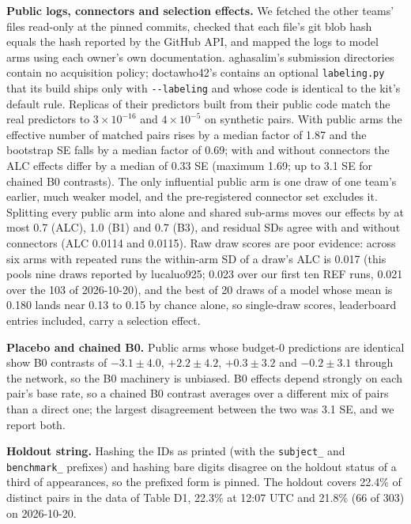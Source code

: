\documentclass[
]{article}
\begin{document}
\textbf{Public logs, connectors and selection effects.} We fetched the
other teams' files read-only at the pinned commits, checked that each
file's git blob hash equals the hash reported by the GitHub API, and
mapped the logs to model arms using each owner's own documentation.
aghasalim's submission directories contain no acquisition policy;
doctawho42's contains an optional \texttt{labeling.py} that its build
ships only with \texttt{-\/-labeling} and whose code is identical to the
kit's default rule. Replicas of their predictors built from their public
code match the real predictors to \(3 \times 10^{-16}\) and
\(4 \times 10^{-5}\) on synthetic pairs. With public arms the effective
number of matched pairs rises by a median factor of 1.87 and the
bootstrap SE falls by a median factor of 0.69; with and without
connectors the ALC effects differ by a median of 0.33 SE (maximum 1.69;
up to 3.1 SE for chained B0 contrasts). The only influential public arm
is one draw of one team's earlier, much weaker model, and the
pre-registered connector set excludes it. Splitting every public arm
into alone and shared sub-arms moves our effects by at most 0.7 (ALC),
1.0 (B1) and 0.7 (B3), and residual SDs agree with and without
connectors (ALC 0.0114 and 0.0115). Raw draw scores are poor evidence:
across six arms with repeated runs the within-arm SD of a draw's ALC is
0.017 (this pools nine draws reported by lucaluo925; 0.023 over our
first ten REF runs, 0.021 over the 103 of 2026-10-20), and the best of
20 draws of a model whose mean is 0.180 lands near 0.13 to 0.15 by
chance alone, so single-draw scores, leaderboard entries included, carry
a selection effect.

\textbf{Placebo and chained B0.} Public arms whose budget-0 predictions
are identical show B0 contrasts of \(-3.1 \pm 4.0\), \(+2.2 \pm 4.2\),
\(+0.3 \pm 3.2\) and \(-0.2 \pm 3.1\) through the network, so the B0
machinery is unbiased. B0 effects depend strongly on each pair's base
rate, so a chained B0 contrast averages over a different mix of pairs
than a direct one; the largest disagreement between the two was 3.1 SE,
and we report both.

\textbf{Holdout string.} Hashing the IDs as printed (with the
\texttt{subject\_} and \texttt{benchmark\_} prefixes) and hashing bare
digits disagree on the holdout status of a third of appearances, so the
prefixed form is pinned. The holdout covers 22.4\% of distinct pairs in
the data of Table D1, 22.3\% at 12:07 UTC and 21.8\% (66 of 303) on
2026-10-20.
\end{document}
